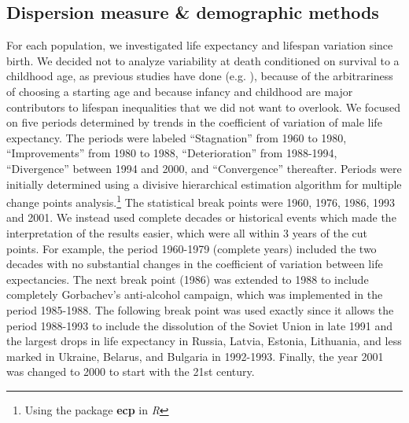 \documentclass{article}
\begin{document}
\begin{spacing}{1.5}
\subsection*{Dispersion measure \& demographic methods}

For each population, we investigated life expectancy and lifespan variation since birth. We decided not to analyze variability at death conditioned on survival to a childhood age, as previous studies have done (e.g. \citet{edwards2005, smits2009}), because of the arbitrariness of choosing a starting age and because infancy and childhood are major contributors to lifespan inequalities that we did not want to overlook. We focused on five periods determined by trends in the coefficient of variation of male life expectancy. The periods were labeled ``Stagnation'' from 1960 to 1980, ``Improvements'' from 1980 to 1988, ``Deterioration'' from 1988-1994, ``Divergence'' between 1994 and 2000, and ``Convergence'' thereafter. Periods were initially determined using a divisive hierarchical estimation algorithm for multiple change points analysis.\footnote{Using the package \textbf{ecp} in \textit{R}} The statistical break points were 1960, 1976, 1986, 1993 and 2001. We instead used complete decades or historical events which made the interpretation of the results easier, which were all within 3 years of the cut points. For example, the period 1960-1979 (complete years) included the two decades with no substantial changes in the coefficient of variation between life expectancies. The next break point (1986) was extended to 1988 to include completely Gorbachev's anti-alcohol campaign, which was implemented in the period 1985-1988. The following break point was used exactly since it allows the period 1988-1993 to include the dissolution of the Soviet Union in late 1991 and the largest drops in life expectancy in Russia, Latvia, Estonia, Lithuania, and less marked in Ukraine, Belarus, and Bulgaria in 1992-1993. Finally, the year 2001 was changed to 2000 to start with the 21st century.



\end{spacing}
\end{document}
